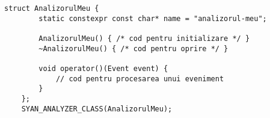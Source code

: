 \begin{lstlisting}[caption=Interfața pe bază de clasă a unui analizor,
                   label=code:analyzer-CXX]
    struct AnalizorulMeu {
        static constexpr const char* name = "analizorul-meu";

        AnalizorulMeu() { /* cod pentru initializare */ }
        ~AnalizorulMeu() { /* cod pentru oprire */ }

        void operator()(Event event) {
            // cod pentru procesarea unui eveniment
        }
    };
    SYAN_ANALYZER_CLASS(AnalizorulMeu);
\end{lstlisting}
